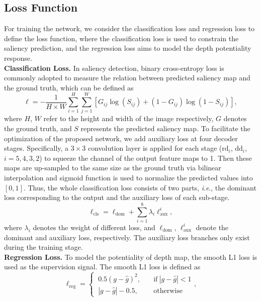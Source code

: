 \documentclass[journal]{IEEEtran}
\newcommand{\ie}{\textit{i}.\textit{e}.}
\begin{document}
\subsection{Loss Function}
For training the network, we consider the classification loss and regression loss to define the loss function, where the classification loss is used to constrain the saliency prediction, and the regression loss aims to model the depth potentiality response. \\
\indent \textbf{Classification Loss.}
In saliency detection, binary cross-entropy loss is commonly adopted to measure the relation between predicted saliency map and the ground truth, which can be defined as
\begin{equation}
\ell = -\frac{1}{H\times W} \sum_{i=1}^{H}\sum_{j=1}^{W}[G_{ij}\log(S_{ij})+ (1-G_{ij})\log(1 - S_{ij})] ,
\end{equation}
where $H$, $W$ refer to the height and width of the image respectively,
$G$ denotes the ground truth, and $S$ represents the predicted saliency map. To facilitate the optimization of the proposed network, we add auxiliary loss at four decoder stages. Specifically, a $3\times 3$ convolution layer is applied for each stage ($\mathrm{rd}_i$, $\mathrm{dd}_i$, $i=5,4,3,2$) to squeeze the channel of the output feature maps to 1. Then these maps are up-sampled to the same size as the ground truth via bilinear interpolation and sigmoid function is used to normalize the predicted values into $[0,1]$. Thus, the whole classification loss consists of two parts, \ie, the dominant loss corresponding to the output and the auxiliary loss of each sub-stage.
\begin{equation}
 \ell_{\mathrm{cls}} = \ell_{\mathrm{dom}} + \sum_{i=1}^{8} \lambda_{i}\ell_{\mathrm{aux}}^i ,
\end{equation}
where $\lambda_i$  denotes the weight of different loss, and $\ell_{\mathrm{dom}}$,
$\ell_{\mathrm{aux}}^i$ denote the dominant and auxiliary loss, respectively. The auxiliary loss branches only exist during the training stage. \\
\indent\textbf{Regression Loss.} To model the potentiality of depth map, the smooth L1 loss \cite{girshick2015fast} is used as the supervision signal. The smooth L1 loss  is defined as
\begin{equation}
 \ell_{\mathrm{reg}} = \left\lbrace 	 \
 \begin{aligned}
	 0.5 (g - \hat{g})^2,  &\quad \mathrm{if}\ |g - \hat{g}| < 1 \\
	 |g - \hat{g}| - 0.5, &\quad \mathrm{otherwise}
 \end{aligned}\right. ,
\end{equation}
\end{document}
